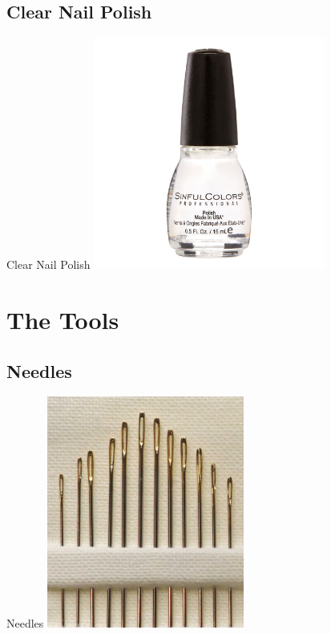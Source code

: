 \documentclass{beamer}
\begin{document}
\subsection{Clear Nail Polish}
\begin{frame}[fragile]{Clear Nail Polish}
\includegraphics[height=3in]{ClearNailPolish.jpeg}
\end{frame}
\section{The Tools}
\frame{\tableofcontents[hideothersubsections,sectionstyle=show/hide]}
\subsection{Needles}
\begin{frame}[fragile]{Needles}
\includegraphics[height=3in]{Needles.jpg}
\end{frame}
\end{document}
